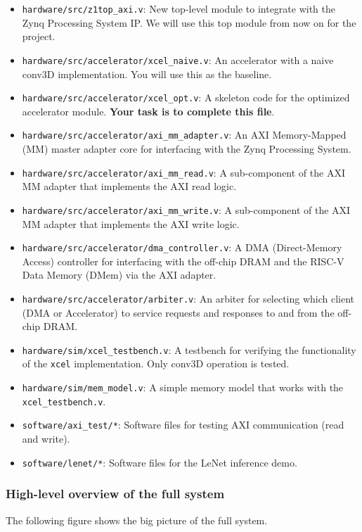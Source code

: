 \documentclass[11pt]{article}
\begin{document}
\begin{itemize}
\item \verb|hardware/src/z1top_axi.v|: New top-level module to integrate with the Zynq Processing System IP. We will use this top module from now on for the project.
\item \verb|hardware/src/accelerator/xcel_naive.v|: An accelerator with a naive conv3D implementation. You will use this as the baseline.
\item \verb|hardware/src/accelerator/xcel_opt.v|: A skeleton code for the optimized accelerator module. \textbf{Your task is to complete this file}.
\item \verb|hardware/src/accelerator/axi_mm_adapter.v|: An AXI Memory-Mapped (MM) master adapter core for interfacing with the Zynq Processing System.
\item \verb|hardware/src/accelerator/axi_mm_read.v|: A sub-component of the AXI MM adapter that implements the AXI read logic.
\item \verb|hardware/src/accelerator/axi_mm_write.v|: A sub-component of the AXI MM adapter that implements the AXI write logic.
\item \verb|hardware/src/accelerator/dma_controller.v|: A DMA (Direct-Memory Access) controller for interfacing with the off-chip DRAM and the RISC-V Data Memory (DMem) via the AXI adapter.
\item \verb|hardware/src/accelerator/arbiter.v|: An arbiter for selecting which client (DMA or Accelerator) to service requests and responses to and from the off-chip DRAM.
\item \verb|hardware/sim/xcel_testbench.v|: A testbench for verifying the functionality of the \texttt{xcel} implementation. Only conv3D operation is tested.
\item \verb|hardware/sim/mem_model.v|: A simple memory model that works with the \verb|xcel_testbench.v|.
\item \verb|software/axi_test/*|: Software files for testing AXI communication (read and write).
\item \verb|software/lenet/*|: Software files for the LeNet inference demo.
\end{itemize}

\subsubsection{High-level overview of the full system}
The following figure shows the big picture of the full system.
\end{document}
